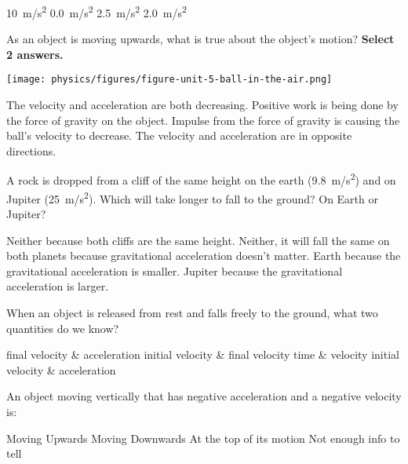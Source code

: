 \documentclass[answers,dvipsnames]{exam}
\begin{document}
\begin{questions}
\begin{randomizechoices}[norandomize]
    \choice \SI{10}{m/s^2}
    \choice \SI{0.0}{m/s^2}
    \correctchoice \SI{2.5}{m/s^2}
    \choice \SI{2.0}{m/s^2}
\end{randomizechoices}

\question
As an object is moving upwards, what is true about the object’s motion? \textbf{Select 2 answers.}

\begin{center}
    \texttt{[image: physics/figures/figure-unit-5-ball-in-the-air.png]}
\end{center}

\begin{randomizechoices}[norandomize]
    \choice The velocity and acceleration are both decreasing.
    \choice Positive work is being done by the force of gravity on the object.
    \correctchoice Impulse from the force of gravity is causing the ball’s velocity to decrease.
    \correctchoice The velocity and acceleration are in opposite directions.
\end{randomizechoices}

\question
A rock is dropped from a cliff of the same height on the earth (\SI{9.8}{m/s^2}) and on Jupiter (\SI{25}{m/s^2}). Which will take longer to fall to the ground? On Earth or Jupiter?

\begin{randomizechoices}[norandomize]
    \choice Neither because both cliffs are the same height.
    \choice Neither, it will fall the same on both planets because gravitational acceleration doesn’t matter.
    \correctchoice Earth because the gravitational acceleration is smaller.
    \choice Jupiter because the gravitational acceleration is larger. 
\end{randomizechoices}

\question
When an object is released from rest and falls freely to the ground, what two quantities do we know?

\begin{randomizechoices}[norandomize]
    \choice final velocity \& acceleration
    \choice initial velocity \& final velocity
    \choice time \& velocity
    \correctchoice initial velocity \& acceleration
\end{randomizechoices}

\question 
An object moving vertically that has negative acceleration and a negative velocity is:

\begin{randomizechoices}[norandomize]
    \choice Moving Upwards
    \correctchoice Moving Downwards
    \choice At the top of its motion
    \choice Not enough info to tell
\end{randomizechoices}


\end{questions}
\end{document}
